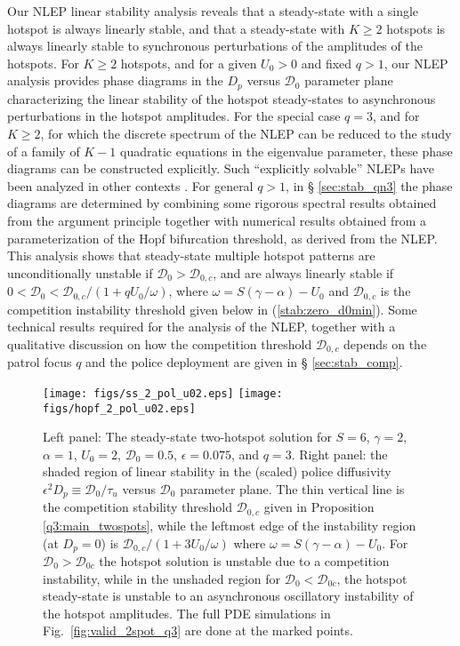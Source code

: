 \documentclass{article}%
\begin{document}
Our NLEP linear stability analysis reveals that a steady-state with a
single hotspot is always linearly stable, and that a steady-state with
$K\geq 2$ hotspots is always linearly stable to synchronous
perturbations of the amplitudes of the hotspots.  For $K\geq 2$
hotspots, and for a given $U_0>0$ and fixed $q>1$, our NLEP analysis
provides phase diagrams in the $D_{p}$ versus ${\mathcal D}_0$
parameter plane characterizing the linear stability of the hotspot
steady-states to asynchronous perturbations in the hotspot
amplitudes. For the special case $q=3$, and for $K\geq 2$, for which
the discrete spectrum of the NLEP can be reduced to the study of a
family of $K-1$ quadratic equations in the eigenvalue parameter, these
phase diagrams can be constructed explicitly. Such ``explicitly
solvable'' NLEPs have been analyzed in other contexts
\cite{kww_crime,mtw_enlep,nec}.  For general $q>1$, in \S
\ref{sec:stab_qn3} the phase diagrams are determined by combining some
rigorous spectral results obtained from the argument principle
together with numerical results obtained from a parameterization of
the Hopf bifurcation threshold, as derived from the NLEP. This
analysis shows that steady-state multiple hotspot patterns are
unconditionally unstable if ${\mathcal D}_0>{\mathcal D}_{0,c}$, and
are always linearly stable if $0<{\mathcal D}_0< {\mathcal
  D}_{0,c}/(1+qU_0/\omega)$, where $\omega=S(\gamma-\alpha)-U_0$ and
${\mathcal D}_{0,c}$ is the competition instability threshold given
below in (\ref{stab:zero_d0min}).  Some technical results required for
the analysis of the NLEP, together with a qualitative discussion on how
the competition threshold ${\mathcal D}_{0,c}$ depends on the patrol
focus $q$ and the police deployment are given in \S
\ref{sec:stab_comp}.

\begin{figure}[htbp]
\centering
\texttt{[image: figs/ss\_2\_pol\_u02.eps]}
\texttt{[image: figs/hopf\_2\_pol\_u02.eps]}
\caption{\label{fig:hopf_pol_intro} Left panel: The steady-state
  two-hotspot solution for $S=6$, $\gamma=2$, $\alpha=1$, $U_0=2$,
  ${\mathcal D}_0=0.5$, $\epsilon=0.075$, and $q=3$. Right panel: the
  shaded region of linear stability in the (scaled) police diffusivity
  $\epsilon^{2}D_p\equiv {{\mathcal D}_0/\tau_u}$ versus ${\mathcal
    D}_0$ parameter plane. The thin vertical line is the competition
  stability threshold ${\mathcal D}_{0,c}$ given in Proposition
  \ref{q3:main_twospots}, while the leftmost edge of the instability
  region (at $D_p=0$) is ${{\mathcal D}_{0,c}/(1+{3U_0/\omega})}$
  where $\omega=S(\gamma-\alpha)-U_0$.  For ${\mathcal D}_0>{\mathcal
    D}_{0c}$ the hotspot solution is unstable due to a competition
  instability, while in the unshaded region for ${\mathcal
    D}_0<{\mathcal D}_{0c}$, the hotspot steady-state is unstable to
  an asynchronous oscillatory instability of the hotspot amplitudes. The full
  PDE simulations in Fig.~\ref{fig:valid_2spot_q3} are done at the marked 
  points.}
\end{figure}
\end{document}
